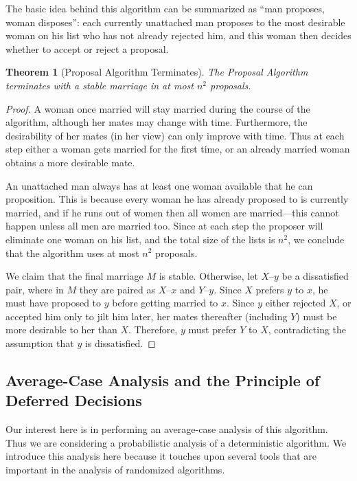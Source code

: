 \documentclass[twoside,12pt]{book}
\theoremstyle{plain}
\newtheorem{theorem}{Theorem}[chapter]
\theoremstyle{definition}
\theoremstyle{remark}
\begin{document}
The basic idea behind this algorithm can be summarized as ``man proposes, woman disposes'': each currently unattached man proposes to the most desirable woman on his list who has not already rejected him, and this woman then decides whether to accept or reject a proposal.

\begin{theorem}[Proposal Algorithm Terminates]
\label{thm:proposal-term}
The Proposal Algorithm terminates with a stable marriage in at most $n^2$ proposals.
\end{theorem}

\begin{proof}
A woman once married will stay married during the course of the algorithm, although her mates may change with time. Furthermore, the desirability of her mates (in her view) can only improve with time. Thus at each step either a woman gets married for the first time, or an already married woman obtains a more desirable mate.

An unattached man always has at least one woman available that he can proposition. This is because every woman he has already proposed to is currently married, and if he runs out of women then all women are married---this cannot happen unless all men are married too. Since at each step the proposer will eliminate one woman on his list, and the total size of the lists is $n^2$, we conclude that the algorithm uses at most $n^2$ proposals.

We claim that the final marriage $M$ is stable. Otherwise, let $X$--$y$ be a dissatisfied pair, where in $M$ they are paired as $X$--$x$ and $Y$--$y$. Since $X$ prefers $y$ to $x$, he must have proposed to $y$ before getting married to $x$. Since $y$ either rejected $X$, or accepted him only to jilt him later, her mates thereafter (including $Y$) must be more desirable to her than $X$. Therefore, $y$ must prefer $Y$ to $X$, contradicting the assumption that $y$ is dissatisfied.
\end{proof}

\subsection{Average-Case Analysis and the Principle of Deferred Decisions}

Our interest here is in performing an average-case analysis of this algorithm. Thus we are considering a probabilistic analysis of a deterministic algorithm. We introduce this analysis here because it touches upon several tools that are important in the analysis of randomized algorithms.
\end{document}
